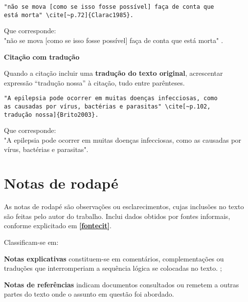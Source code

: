 \begin{alineas}
\begin{verbatim}
"não se mova [como se isso fosse possível] faça de conta que 
está morta" \cite[~p.72]{Clarac1985}.
\end{verbatim}

Que corresponde:\\

"não se mova [como se isso fosse possível] faça de conta que 
está morta" \cite[~p.72]{Clarac1985}. \\

\item

\textbf{Citação com tradução}

Quando a citação incluir uma \textbf{tradução do texto original}, acrescentar expressão “tradução nossa” à citação, tudo entre parênteses.

\begin{verbatim}
"A epilepsia pode ocorrer em muitas doenças infecciosas, como 
as causadas por vírus, bactérias e parasitas" \cite[~p.102,
tradução nossa]{Brito2003}.
\end{verbatim}

Que corresponde:\\

"A epilepsia pode ocorrer em muitas doenças infecciosas, como 
as causadas por vírus, bactérias e parasitas"\cite[~p.102, tradução nossa]{Brito2003}.\\
\end{alineas}

\section{Notas de rodapé}
As notas de rodapé são observações ou esclarecimentos, cujas inclusões no texto são feitas pelo autor do trabalho. Inclui dados obtidos por fontes informais, conforme explicitado em \textbf{\ref{fontecit}}.
	

Classificam-se em:\\
\begin{alineas}
\item
\textbf{Notas explicativas} constituem-se em comentários, complementações ou traduções que interromperiam a sequência lógica se colocadas no texto. \cite{Soares2002};

\item
\textbf{Notas de referências} indicam documentos consultados ou remetem a outras partes do texto onde o assunto em questão foi abordado. \\
\end{alineas}

